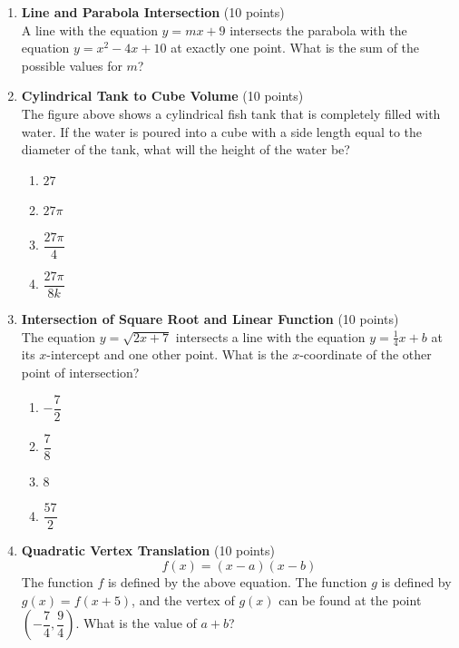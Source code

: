 \begin{enumerate}
  \item \textbf{Line and Parabola Intersection} (10 points)\\
  A line with the equation $y = m x + 9$ intersects the parabola with the 
  equation $y = x^2 - 4x + 10$ at exactly one point. What is the sum of the 
  possible values for $m$?
  \begin{subanswer}
  \end{subanswer}

  \item \textbf{Cylindrical Tank to Cube Volume} (10 points)\\
  The figure above shows a cylindrical fish tank that is completely 
  filled with water. If the water is poured into a cube with a side 
  length equal to the diameter of the tank, what will the height of 
  the water be?
  \begin{enumerate}[label=(\Alph*)]
    \item $27$
    \item $27\pi$
    \item $\dfrac{27\pi}{4}$
    \item $\dfrac{27\pi}{8k}$
  \end{enumerate}
  \begin{subanswer}
  \end{subanswer}



  \newpage


  \item \textbf{Intersection of Square Root and Linear Function} (10 points)\\
  The equation $y=\sqrt{2 x+7}$ intersects a line with the equation 
  $y=\frac{1}{4} x+b$ at its $x$-intercept and one other point. What 
  is the $x$-coordinate of the other point of intersection?
  \begin{enumerate}[label=(\Alph*)]
    \item $-\dfrac{7}{2}$
    \item $\dfrac{7}{8}$
    \item $8$
    \item $\dfrac{57}{2}$
  \end{enumerate}
  \begin{subanswer}
  \end{subanswer}

  \item \textbf{Quadratic Vertex Translation} (10 points)\\
  $$
  f(x)=(x-a)(x-b)
  $$
  The function $f$ is defined by the above equation. The function $g$ is 
  defined by $g(x)=f(x+5)$, and the vertex of $g(x)$ can be found at the 
  point $\left(-\dfrac{7}{4}, \dfrac{9}{4}\right)$. What is the value of $a+b$?
  \begin{subanswer}
  \end{subanswer}






\end{enumerate}
